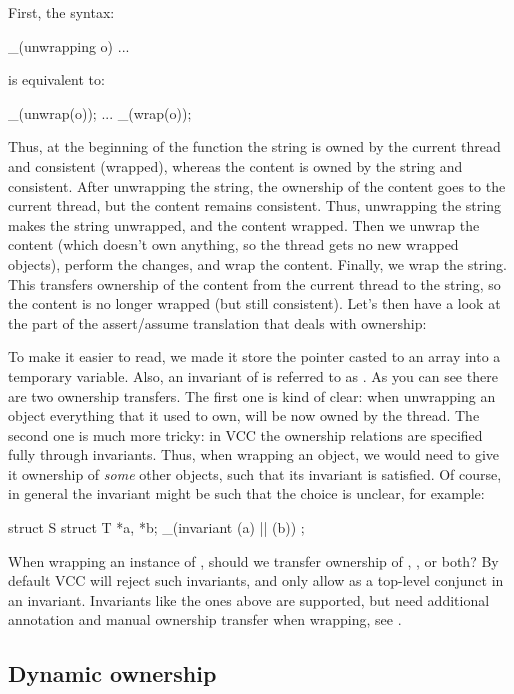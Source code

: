 \noindent
First, the syntax:
\begin{VCC}
_(unwrapping o) { ... }
\end{VCC}
is equivalent to:
\begin{VCC}
_(unwrap(o)); { ... } _(wrap(o));
\end{VCC}
Thus, at the beginning of the function the string is owned by the current thread and consistent (\ie wrapped),
whereas the content is owned by the string and consistent.
After unwrapping the string, the ownership of the content goes to the current thread,
but the content remains consistent.
Thus, unwrapping the string makes the string unwrapped, and the content wrapped.
Then we unwrap the content (which doesn't own anything, so the thread gets no new wrapped objects), perform the changes,
and wrap the content.
Finally, we wrap the string.
This transfers ownership of the content from the current thread to the string, so the content is no longer wrapped (but still consistent).
Let's then have a look at the part of the assert/assume translation
that deals with ownership:


\noindent
To make it easier to read, we made it store the  pointer
casted to an array into a temporary variable.
Also, an invariant of  is referred to as .
As you can see there are two ownership transfers.
The first one is kind of clear: when unwrapping an object everything that it used
to own, will be now owned by the thread.
The second one is much more tricky: 
in VCC the ownership relations are specified fully through invariants.
Thus, when wrapping an object, we would need to give it ownership
of \emph{some} other objects, such that its invariant is satisfied.
Of course, in general the invariant might be such that the choice
is unclear, for example:
\begin{VCC}
struct S {
  struct T *a, *b;
  _(invariant \mine(a) || \mine(b))
};
\end{VCC}
When wrapping an instance of , should we transfer ownership of , , or both?
By default VCC will reject such invariants, and only allow 
as a top-level conjunct in an invariant.
Invariants like the ones above are supported, but need additional annotation
and manual ownership transfer when wrapping, see .


\subsection{Dynamic ownership}
\label{sect:dynamic-ownership}

